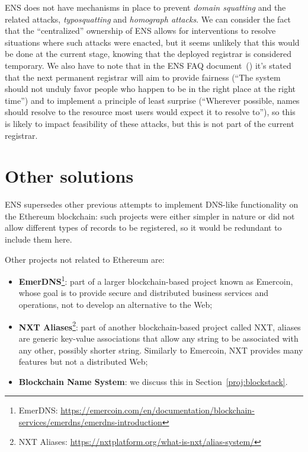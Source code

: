 \documentclass[mscthesis]{usiinfthesis}
\begin{document}
ENS does not have mechanisms in place to prevent \emph{domain squatting} and the related attacks, \emph{typosquatting} and \emph{homograph attacks}. We can consider the fact that the ``centralized'' ownership of ENS allows for interventions to resolve situations where such attacks were enacted, but it seems unlikely that this would be done at the current stage, knowing that the deployed registrar is considered temporary. We also have to note that in the ENS FAQ document~(\cite{website:ensfaq}) it's stated that the next permanent registrar will aim to provide fairness (``The system should not unduly favor people who happen to be in the right place at the right time'') and to implement a principle of least surprise (``Wherever possible, names should resolve to the resource most users would expect it to resolve to''), so this is likely to impact feasibility of these attacks, but this is not part of the current registrar.

\section{Other solutions}
ENS supersedes other previous attempts to implement DNS-like functionality on the Ethereum blockchain: such projects were either simpler in nature or did not allow different types of records to be registered, %
so it would be redundant to include them here.

Other projects not related to Ethereum are:
\begin{itemize}
	\item \textbf{EmerDNS}\footnote{EmerDNS: \url{https://emercoin.com/en/documentation/blockchain-services/emerdns/emerdns-introduction}}: part of a larger blockchain-based project known as Emercoin, whose goal is to provide secure and distributed business services and operations, not to develop an alternative to the Web;
	\item \textbf{NXT Aliases}\footnote{NXT Aliases: \url{https://nxtplatform.org/what-is-nxt/alias-system/}}: part of another blockchain-based project called NXT, aliases are  generic key-value associations that allow any string to be associated with any other, possibly shorter string. Similarly to Emercoin, NXT provides many features but not a distributed Web;
	\item \textbf{Blockchain Name System}: we discuss this in Section~\ref{proj:blockstack}.
\end{itemize}
\end{document}
